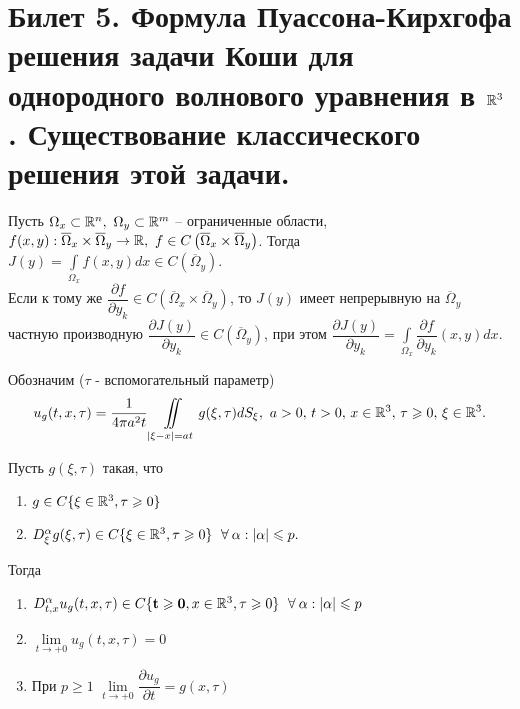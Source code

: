 \documentclass[../main.tex]{subfiles}
\begin{document}
\section{Билет 5. Формула Пуассона-Кирхгофа решения задачи Коши для однородного волнового уравнения в \texorpdfstring{$\mathbb{R}^3$}{R^3}. Существование классического решения этой задачи.}
\begin{theorem}
Пусть $\Omega_x\subset\R^n,\ \Omega_y\subset\R^m$ -- ограниченные области, $f(x,y):\overline{\Omega}_x\times\overline{\Omega}_y\rightarrow \mathbb{R},\ f\in C\left(\overline{\Omega}_x\times\overline{\Omega}_y \right)$. Тогда $J(y)=\displaystyle\int\limits_{\Omega_x}f(x,y)dx\in C\left(\overline{\Omega}_y \right)$.\\
Если к тому же $\dfrac{\partial f}{\partial y_k}\in C\left(\overline{\Omega}_x\times\overline{\Omega}_y \right)$, то $J(y)$ имеет непрерывную на $\overline{\Omega}_y$ частную производную $\dfrac{\partial J(y)}{\partial y_k}\in C\left(\overline{\Omega}_y \right)$, при этом $\dfrac{\partial J(y)}{\partial y_k}=\displaystyle\int\limits_{\Omega_x}\dfrac{\partial f}{\partial y_k}(x,y)dx$.
\end{theorem}
Обозначим ($\tau$ - вспомогательный параметр)
\[
u_g(t,x,\tau)=\frac{1}{4\pi a^2t}\displaystyle\iint\limits_{|\xi - x|=at}g(\xi ,\tau ) dS_{\xi},\ a>0,\, t> 0,\, x\in \R^3,\, \tau \geq 0,\, \xi\in\R^3.
\]
\begin{lemma}
Пусть $g(\xi, \tau )$ такая, что 
\begin{enumerate}
\item $g \in C\{\xi\in\mathbb{R}^3,\tau\geqslant 0 \}$
\item $D_{\xi}^{\alpha}g(\xi , \tau )\in C\{\xi\in\R^3,\tau\geq 0 \}\ \forall\alpha : |\alpha |\leq p.$
\end{enumerate}
Тогда
\begin{enumerate}
\item $D_{t,x}^{\alpha}u_g(t,x,\tau )\in C\{\mathbf{t\geq 0}, x\in\R^3,\tau\geq 0 \}\ \forall\alpha : |\alpha |\leq p$
\item $\lim\limits_{t\rightarrow +0}u_g(t,x,\tau )=0$
\item При $p\geq 1$ $\lim\limits_{t\rightarrow +0}\dfrac{\partial u_g}{\partial t}=g(x,\tau)$
\end{enumerate}
\end{lemma}
\end{document}
